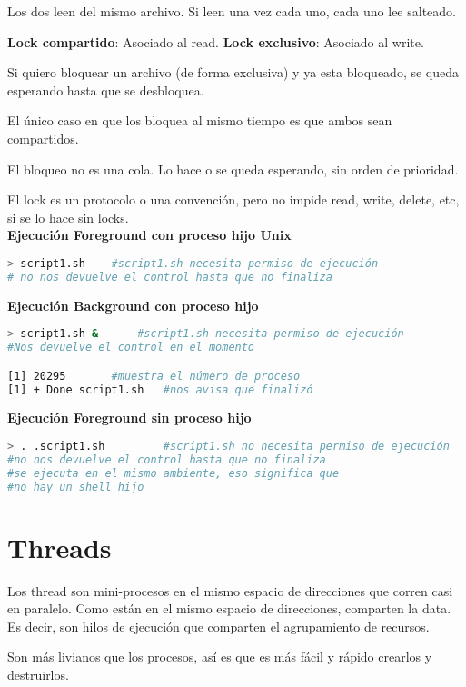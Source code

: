\documentclass[a4paper, twoside]{article}
\begin{document}
Los dos leen del mismo archivo. Si leen una vez cada uno, cada uno lee salteado.

\textbf{Lock compartido}: Asociado al read.
\textbf{Lock exclusivo}: Asociado al write.

Si quiero bloquear un archivo (de forma exclusiva) y ya esta bloqueado, se queda esperando hasta que se desbloquea.

El único caso en que los bloquea al mismo tiempo es que ambos sean compartidos.

El bloqueo no es una cola. Lo hace o se queda esperando, sin orden de prioridad.

El lock es un protocolo o una convención, pero no impide read, write, delete, etc, si se lo hace sin locks.\\

\textbf{Ejecución Foreground con proceso hijo Unix}
\begin{lstlisting}[language=sh]
> script1.sh 	#script1.sh necesita permiso de ejecución
# no nos devuelve el control hasta que no finaliza
\end{lstlisting}

\textbf{Ejecución Background con proceso hijo}
\begin{lstlisting}[language=sh]
> script1.sh & 		#script1.sh necesita permiso de ejecución
#Nos devuelve el control en el momento

[1] 20295 		#muestra el número de proceso
[1] + Done script1.sh 	#nos avisa que finalizó
\end{lstlisting}

\textbf{Ejecución Foreground sin proceso hijo}
\begin{lstlisting}[language=sh]
> . .script1.sh 		#script1.sh no necesita permiso de ejecución
#no nos devuelve el control hasta que no finaliza
#se ejecuta en el mismo ambiente, eso significa que
#no hay un shell hijo
\end{lstlisting}

\newpage
\section{Threads}
Los thread son mini-procesos en el mismo espacio de direcciones que corren casi en paralelo. Como están en el mismo espacio de direcciones, comparten la data. Es decir, son hilos de ejecución que comparten el agrupamiento de recursos.

Son más livianos que los procesos, así es que es más fácil y rápido crearlos y destruirlos.\\
\end{document}
